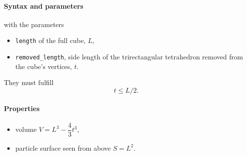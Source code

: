 \begin{figure}[h]
\hfill
{}
\hfill
{}
\hfill
\end{figure}

\FloatBarrier

\paragraph{Syntax and parameters}
\begin{quote}
\end{quote}
with the parameters
\begin{itemize}
\item \texttt{length} of the full cube, $L$,
\item \texttt{removed\_length}, side length of the trirectangular tetrahedron removed from the cube's vertices, $t$.
\end{itemize}
They must fulfill
\begin{displaymath}
  t \le L/2.
\end{displaymath}

\paragraph{Properties}
\begin{itemize}
\item volume $V = L^3 - \dfrac{4}{3}t^3$,
\item particle surface seen from above $S = L^2$.
\end{itemize}

